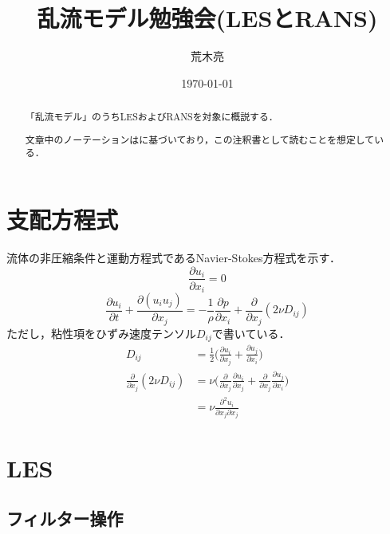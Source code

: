 \documentclass[12pt,a4paper]{jsarticle}
\title{乱流モデル勉強会(LESとRANS)}
\author{荒木亮}
\date{\today}
\begin{document}
\maketitle
\begin{abstract}
  「乱流モデル」のうちLESおよびRANSを対象に概説する．

  文章中のノーテーションは\cite{Kajishima}に基づいており，この注釈書として読むことを想定している．
\end{abstract}


\section{支配方程式}
\label{sec:BasicKnowledge}

流体の非圧縮条件と運動方程式であるNavier-Stokes方程式を示す．
\begin{equation}
  \frac{\partial u_i}{\partial x_i} = 0
  \label{eq:Incompressibility}
\end{equation}
\begin{equation}
  \frac{\partial u_i}{\partial t} +\frac{\partial (u_i u_j)}{\partial x_j} = -\frac{1}{\rho} \frac{\partial p}{\partial x_i} +\frac{\partial}{\partial x_j} (2 \nu D_{ij})
\label{eq:N-SEquation}
\end{equation}
ただし，粘性項をひずみ速度テンソル$D_{ij}$で書いている．
\begin{align}
  D_{ij} &= \frac{1}{2} \Big( \frac{\partial u_i}{\partial x_j} +\frac{\partial u_j}{\partial x_i} \Big)
  \label{eq:VelocityStrainTensor} \\
  \frac{\partial}{\partial x_j} (2 \nu D_{ij}) &= \nu \Big( \frac{\partial}{\partial x_j} \frac{\partial u_i}{\partial x_j} +\frac{\partial}{\partial x_j} \frac{\partial u_j}{\partial x_i} \Big) \nonumber \\
    &= \nu \frac{\partial^2 u_i}{\partial x_j \partial x_j}
\label{eq:DiffusionTerm}
\end{align}


\clearpage
\section{LES}
\label{sec:LES}


\subsection{フィルター操作}
\label{subsec:Filter}

\end{document}
